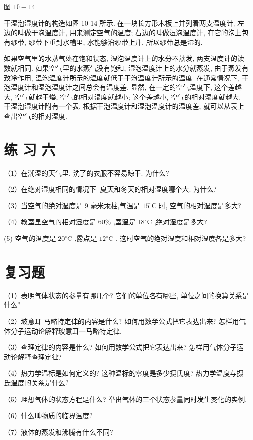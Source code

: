 \documentclass[10pt]{article}
\begin{document}
图 \({10} - {14}\)

干湿泡湿度计的构造如图 10-14 所示. 在一块长方形木板上并列着两支温度计, 左边的叫做干泡温度计, 用来测定空气的温度; 右边的叫做湿泡温度计, 在它的泡上包有纱带, 纱带下垂到水槽里, 水能够沿纱带上升, 所以纱带总是湿的.

如果空气里的水蒸气处在饱和状态, 湿泡温度计上的水分不蒸发, 两支温度计的读数就相同. 如果空气里的水蒸气没有饱和, 湿泡温度计上的水分就蒸发, 由于蒸发有致冷作用, 湿泡温度计所示的温度就低于干泡温度计所示的温度. 在通常情况下, 干泡温度计和湿泡温度计之间总会有温度差. 显然, 在一定的空气温度下, 这个差越大, 空气就越干燥, 空气的相对湿度就越小; 这个差越小, 空气的相对湿度就越大. 干湿泡湿度计附有一个表, 根据干泡温度计和湿泡温度计的温度差, 就可以从表上查出空气的相对湿度.

\section*{练 习 六}

（1）在潮湿的天气里, 洗了的衣服不容易晾干. 为什么?

（2）在绝对湿度相同的情况下, 夏天和冬天的相对湿度哪个大. 为什么?

（3）当空气的绝对湿度是 9 毫米汞柱,气温是 \({15}^{ \circ }\mathrm{C}\) 时, 空气的相对湿度是多大?

（4）教室里空气的相对湿度是 \({60}\%\) ,室温是 \({18}^{ \circ }\mathrm{C}\) ,绝对湿度是多大?

(5) 空气的温度是 \({20}^{ \circ }\mathrm{C}\) ,露点是 \({12}^{ \circ }\mathrm{C}\) . 这时空气的绝对湿度和相对湿度各是多大?

\section*{复习题}

（1）表明气体状态的参量有哪几个? 它们的单位各有哪些, 单位之间的换算关系是什么?

（2）玻意耳-马略特定律的内容是什么? 如何用数学公式把它表达出来? 怎样用气体分子运动论解释玻意耳一马略特定律.

（3）查理定律的内容是什么? 如何用数学公式把它表达出来? 怎样用气体分子运动论解释查理定律?

（4）热力学温标是如何定义的? 这种温标的零度是多少摄氏度? 热力学温度与摄氏温度的关系是什么?

（5）理想气体的状态方程是什么? 举出气体的三个状态参量同时发生变化的实例.

（6）什么叫物质的临界温度?

（7）液体的蒸发和沸腾有什么不同?
\end{document}
